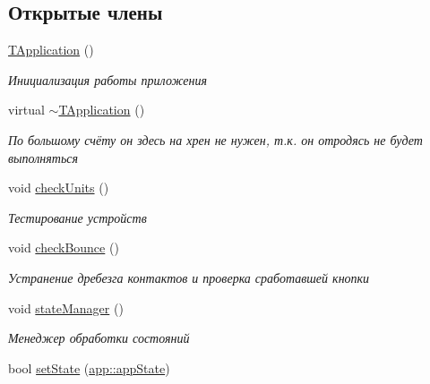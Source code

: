 \subsection*{Открытые члены}
\begin{DoxyCompactItemize}
\item 
\mbox{\label{classapp_1_1_t_application_ae9d037b0e6ebc6c26cd390ae9f5ff706}} 
\hyperlink{classapp_1_1_t_application_ae9d037b0e6ebc6c26cd390ae9f5ff706}{T\+Application} ()
\begin{DoxyCompactList}\small\item\em Инициализация работы приложения \end{DoxyCompactList}\item 
virtual \hyperlink{classapp_1_1_t_application_a5b7af31c95dab9a3f14ee792429a0737}{$\sim$\+T\+Application} ()
\begin{DoxyCompactList}\small\item\em По большому счёту он здесь на хрен не нужен, т.\+к. он отродясь не будет выполняться \end{DoxyCompactList}\item 
void \hyperlink{classapp_1_1_t_application_acf71a4fe338cbc1e771cc9a60431c3bf}{check\+Units} ()
\begin{DoxyCompactList}\small\item\em Тестирование устройств \end{DoxyCompactList}\item 
void \hyperlink{classapp_1_1_t_application_a4c4d1d33ea8ab73ba49a59528d200501}{check\+Bounce} ()
\begin{DoxyCompactList}\small\item\em Устранение дребезга контактов и проверка сработавшей кнопки \end{DoxyCompactList}\item 
\mbox{\label{classapp_1_1_t_application_ae673484375cccb05d53f9f4cbeeba985}} 
void \hyperlink{classapp_1_1_t_application_ae673484375cccb05d53f9f4cbeeba985}{state\+Manager} ()
\begin{DoxyCompactList}\small\item\em Менеджер обработки состояний \end{DoxyCompactList}\item 
bool \hyperlink{classapp_1_1_t_application_a3df1835103a3ba338821c27ad05f9f8d}{set\+State} (\hyperlink{group___xD0_x9F_xD0_xB5_xD1_x80_xD0_xB5_xD1_x87_xD0_xB8_xD1_x81_xD0_xBB_xD0_xB5_xD0_xBD_xD0_xB8_xD1_x8F_ga290e8080c661e52c2f685fd4af148acf}{app\+::app\+State})

\end{DoxyCompactItemize}
